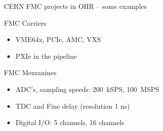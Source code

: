 \documentclass[compress,red]{beamer}
\begin{document}
% 

\begin{frame}{CERN FMC projects in OHR -- some examples}
\begin{block}{FMC Carriers}
	\begin{itemize}
		\item VME64x, PCIe, AMC, VXS
		\item PXIe in the pipeline
	\end{itemize}
\end{block}

\begin{block}{FMC Mezzanines}
	\begin{itemize}
		\item ADC's, sampling speeds: 200~kSPS, 100~MSPS
		\item TDC and Fine delay (resolution 1 ns)
		\item Digital I/O: 5 channels, 16 channels
	\end{itemize}
\end{block}
\end{frame}
\end{document}
